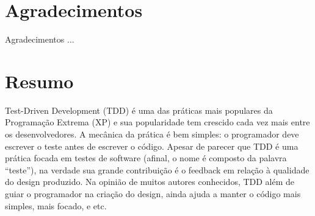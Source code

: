 \documentclass[11pt,twoside,a4paper]{book}
\begin{document}




    
      


\chapter*{Agradecimentos}
Agradecimentos ...

\chapter*{Resumo}

Test-Driven Development (TDD) é uma das práticas mais populares da Programação
Extrema (XP) e sua popularidade tem crescido cada vez mais entre os
desenvolvedores.
A mecânica da prática é bem simples: o programador deve escrever o teste antes
de escrever o código. Apesar de parecer que TDD é uma prática focada em testes
de software (afinal, o nome é composto da palavra ``teste''), na verdade sua
grande contribuição é o feedback em relação à qualidade do design produzido.
Na opinião de muitos autores conhecidos, TDD além de guiar o programador na
criação do design, ainda ajuda a manter o código mais simples,
mais focado, e etc.
\end{document}
